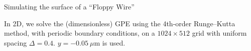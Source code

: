 \begin{chapter}{\label{cha:afm}Simulating the surface of a ``Floppy Wire''}





In 2D, we solve the (dimensionless) GPE using the 4th-order Runge--Kutta
method, with periodic boundary conditions, on a $1024\times512$
grid with uniform spacing $\Delta=0.4$. %
$y = -0.05~\mu$m is used. 





\end{chapter}
